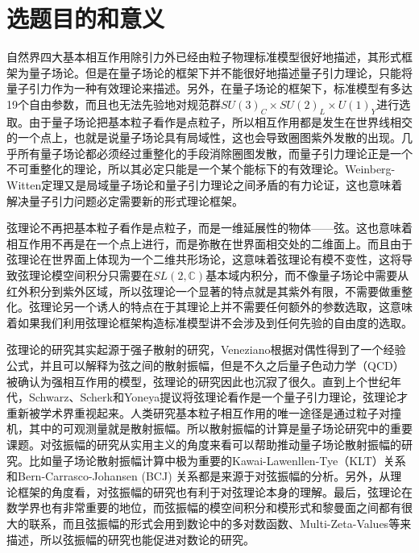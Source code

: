 \documentclass[type = bachelor]{whu-proposal}  %
\begin{document}


\section{选题目的和意义}
自然界四大基本相互作用除引力外已经由粒子物理标准模型很好地描述，其形式框架为量子场论。但是在量子场论的框架下并不能很好地描述量子引力理论，只能将量子引力作为一种有效理论来描述。另外，在量子场论的框架下，标准模型有多达19个自由参数，而且也无法先验地对规范群$SU(3)_C\times SU(2)_L\times U(1)_Y$进行选取。由于量子场论把基本粒子看作是点粒子，所以相互作用都是发生在世界线相交的一个点上，也就是说量子场论具有局域性，这也会导致圈图紫外发散的出现。几乎所有量子场论都必须经过重整化的手段消除圈图发散，而量子引力理论正是一个不可重整化的理论，所以其必定只能是一个某个能标下的有效理论。Weinberg-Witten定理又是局域量子场论和量子引力理论之间矛盾的有力论证\cite{Weinberg:1980kq}，这也意味着解决量子引力问题必定需要新的形式理论框架。

弦理论不再把基本粒子看作是点粒子，而是一维延展性的物体——弦。这也意味着相互作用不再是在一个点上进行，而是弥散在世界面相交处的二维面上\cite{Polchinski:1998rq}。而且由于弦理论在世界面上体现为一个二维共形场论，这意味着弦理论有模不变性，这将导致弦理论模空间积分只需要在$SL(2,\mathbb{C})$基本域内积分，而不像量子场论中需要从红外积分到紫外区域，所以弦理论一个显著的特点就是其紫外有限，不需要做重整化\cite{Witten:2015mec}。弦理论另一个诱人的特点在于其理论上并不需要任何额外的参数选取，这意味着如果我们利用弦理论框架构造标准模型讲不会涉及到任何先验的自由度的选取。

弦理论的研究其实起源于强子散射的研究\cite{limiao}，Veneziano根据对偶性得到了一个经验公式，并且可以解释为弦之间的散射振幅，但是不久之后量子色动力学（QCD）被确认为强相互作用的模型，弦理论的研究因此也沉寂了很久。直到上个世纪年代，Schwarz、Scherk和Yoneya提议将弦理论看作是一个量子引力理论，弦理论才重新被学术界重视起来。人类研究基本粒子相互作用的唯一途径是通过粒子对撞机，其中的可观测量就是散射振幅。所以散射振幅的计算是量子场论研究中的重要课题。对弦振幅的研究从实用主义的角度来看可以帮助推动量子场论散射振幅的研究。比如量子场论散射振幅计算中极为重要的Kawai-Lawenllen-Tye（KLT）关系\cite{Kawai:1985xq}和Bern-Carrasco-Johansen (BCJ) 关系\cite{Bern:2010ue}都是来源于对弦振幅的分析。另外，从理论框架的角度看，对弦振幅的研究也有利于对弦理论本身的理解。最后，弦理论在数学界也有非常重要的地位，而弦振幅的模空间积分和模形式和黎曼面之间都有很大的联系，而且弦振幅的形式会用到数论中的多对数函数、Multi-Zeta-Values等来描述\cite{Broedel:2014vla}，所以弦振幅的研究也能促进对数论的研究\cite{schlottererNumberTheorySuperstring2020}。
\end{document}
